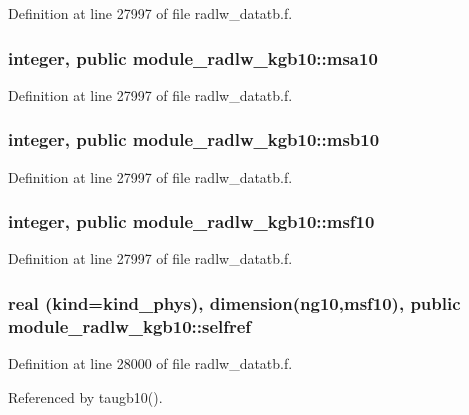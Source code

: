 Definition at line 27997 of file radlw\+\_\+datatb.\+f.

\subsubsection[{\texorpdfstring{msa10}{msa10}}]{\setlength{\rightskip}{0pt plus 5cm}integer, public module\+\_\+radlw\+\_\+kgb10\+::msa10}\hypertarget{namespacemodule__radlw__kgb10_a2305b922082d1cc367276b636f09fb6c}{}\label{namespacemodule__radlw__kgb10_a2305b922082d1cc367276b636f09fb6c}


Definition at line 27997 of file radlw\+\_\+datatb.\+f.

\subsubsection[{\texorpdfstring{msb10}{msb10}}]{\setlength{\rightskip}{0pt plus 5cm}integer, public module\+\_\+radlw\+\_\+kgb10\+::msb10}\hypertarget{namespacemodule__radlw__kgb10_af33570d793ca152588c14ce30ac30798}{}\label{namespacemodule__radlw__kgb10_af33570d793ca152588c14ce30ac30798}


Definition at line 27997 of file radlw\+\_\+datatb.\+f.

\subsubsection[{\texorpdfstring{msf10}{msf10}}]{\setlength{\rightskip}{0pt plus 5cm}integer, public module\+\_\+radlw\+\_\+kgb10\+::msf10}\hypertarget{namespacemodule__radlw__kgb10_a1b69c6fe99ed4ebc7b3d78b8f842b880}{}\label{namespacemodule__radlw__kgb10_a1b69c6fe99ed4ebc7b3d78b8f842b880}


Definition at line 27997 of file radlw\+\_\+datatb.\+f.

\subsubsection[{\texorpdfstring{selfref}{selfref}}]{\setlength{\rightskip}{0pt plus 5cm}real (kind=kind\+\_\+phys), dimension(ng10,{\bf msf10}), public module\+\_\+radlw\+\_\+kgb10\+::selfref}\hypertarget{namespacemodule__radlw__kgb10_a48247dea283a611ebe57dd1c164dda69}{}\label{namespacemodule__radlw__kgb10_a48247dea283a611ebe57dd1c164dda69}


Definition at line 28000 of file radlw\+\_\+datatb.\+f.



Referenced by taugb10().

